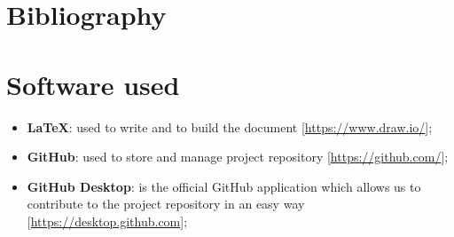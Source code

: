 \section{Bibliography}
\section{Software used}
\begin{itemize}
\item \textbf{\LaTeX}: used to write and to build the document [\url{https://www.draw.io/}];
\item\textbf{GitHub}: used to store and manage project repository [\url{https://github.com/}];
\item\textbf{GitHub Desktop}: is the official GitHub application which allows us to contribute to the project repository in an easy way [\url{https://desktop.github.com}];
\end{itemize}


